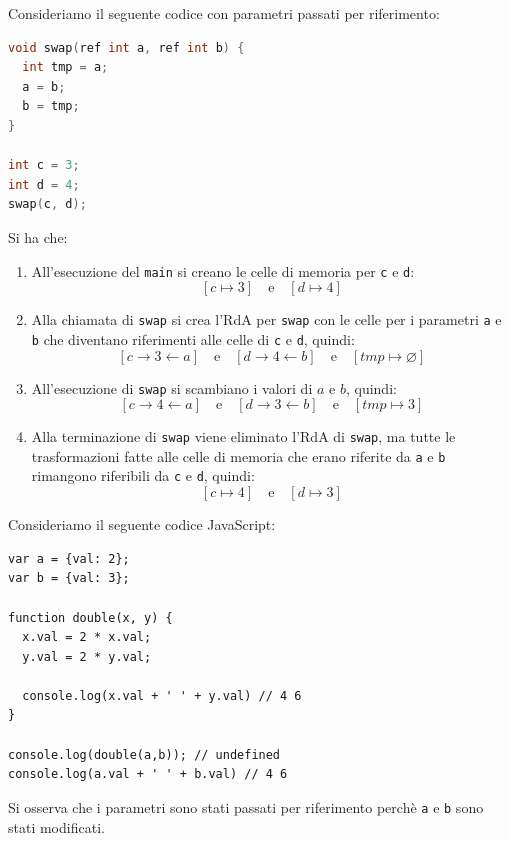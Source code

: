 \documentclass[a4paper]{article}
\begin{document}
\begin{example}
  Consideriamo il seguente codice con parametri passati per riferimento:
\begin{lstlisting}[language=c]
void swap(ref int a, ref int b) {
  int tmp = a;
  a = b;
  b = tmp;
}

int c = 3;
int d = 4;
swap(c, d);
\end{lstlisting}
  Si ha che:
  \begin{enumerate}
    \item All'esecuzione del \texttt{main} si creano le celle di memoria per \texttt{c}
      e \texttt{d}:
      \[
        \left[ c \mapsto 3 \right] \quad \text{e} \quad
        \left[ d \mapsto 4 \right]
      \] 

    \item Alla chiamata di \texttt{swap} si crea l'RdA per \texttt{swap} con le celle
      per i parametri \texttt{a} e \texttt{b} che diventano riferimenti alle celle di
      \texttt{c} e \texttt{d}, quindi:
      \[
        \left[ c \to 3 \leftarrow a \right] \quad \text{e} \quad
        \left[ d \to 4 \leftarrow b \right] \quad \text{e} \quad
        \left[ tmp \mapsto \varnothing \right]
      \]

    \item All'esecuzione di \texttt{swap} si scambiano i valori di \( a \) e \( b \),
      quindi:
      \[
        \left[ c \to 4 \leftarrow a \right] \quad \text{e} \quad
        \left[ d \to 3 \leftarrow b \right] \quad \text{e} \quad
        \left[ tmp \mapsto 3 \right]
      \]

    \item Alla terminazione di \texttt{swap} viene eliminato l'RdA di \texttt{swap},
      ma tutte le trasformazioni fatte alle celle di memoria che erano riferite da
      \texttt{a} e \texttt{b} rimangono riferibili da \texttt{c} e \texttt{d}, quindi:
      \[
        \left[ c \mapsto 4 \right] \quad \text{e} \quad
        \left[ d \mapsto 3 \right]
      \]
  \end{enumerate}
\end{example}

\begin{example}
  Consideriamo il seguente codice JavaScript:
\begin{lstlisting}
var a = {val: 2};
var b = {val: 3};

function double(x, y) {
  x.val = 2 * x.val;
  y.val = 2 * y.val;

  console.log(x.val + ' ' + y.val) // 4 6
}

console.log(double(a,b)); // undefined
console.log(a.val + ' ' + b.val) // 4 6
\end{lstlisting}
  Si osserva che i parametri sono stati passati per riferimento perchè \texttt{a} e \texttt{b}
  sono stati modificati.
\end{example}
\end{document}
